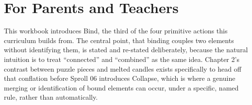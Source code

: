 \documentclass[11pt]{book}
\begin{document}
\chapter*{For Parents and Teachers}

This workbook introduces Bind, the third of the four primitive actions this curriculum builds from. The central point, that binding couples two elements without identifying them, is stated and re-stated deliberately, because the natural intuition is to treat ``connected'' and ``combined'' as the same idea. Chapter 2's contrast between puzzle pieces and melted candles exists specifically to head off that conflation before Sproll 06 introduces Collapse, which is where a genuine merging or identification of bound elements can occur, under a specific, named rule, rather than automatically.
\end{document}
